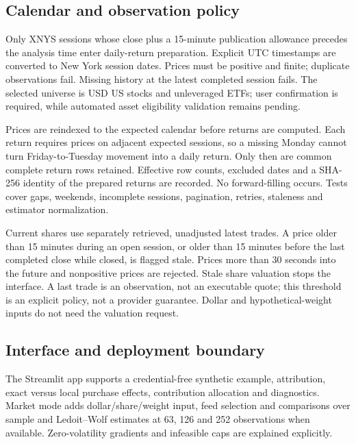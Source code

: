 \documentclass[
  american,
  11pt,
]{article}
\begin{document}
\subsection{Calendar and observation
policy}\label{calendar-and-observation-policy}

Only XNYS sessions whose close plus a 15-minute publication allowance
precedes the analysis time enter daily-return preparation. Explicit UTC
timestamps are converted to New York session dates. Prices must be
positive and finite; duplicate observations fail. Missing history at the
latest completed session fails. The selected universe is USD US stocks
and unleveraged ETFs; user confirmation is required, while automated
asset eligibility validation remains pending.

Prices are reindexed to the expected calendar before returns are
computed. Each return requires prices on adjacent expected sessions, so
a missing Monday cannot turn Friday-to-Tuesday movement into a daily
return. Only then are common complete return rows retained. Effective
row counts, excluded dates and a SHA-256 identity of the prepared
returns are recorded. No forward-filling occurs. Tests cover gaps,
weekends, incomplete sessions, pagination, retries, staleness and
estimator normalization.

Current shares use separately retrieved, unadjusted latest trades. A
price older than 15 minutes during an open session, or older than 15
minutes before the last completed close while closed, is flagged stale.
Prices more than 30 seconds into the future and nonpositive prices are rejected. Stale share valuation stops
the interface. A last trade is an observation, not an executable quote;
this threshold is an explicit policy, not a provider guarantee. Dollar
and hypothetical-weight inputs do not need the valuation request.

\subsection{Interface and deployment
boundary}\label{interface-and-deployment-boundary}

The Streamlit app supports a credential-free synthetic example,
attribution, exact versus local purchase effects, contribution
allocation and diagnostics. Market mode adds dollar/share/weight input,
feed selection and comparisons over sample and Ledoit--Wolf estimates at
63, 126 and 252 observations when available. Zero-volatility gradients
and infeasible caps are explained explicitly.
\end{document}
